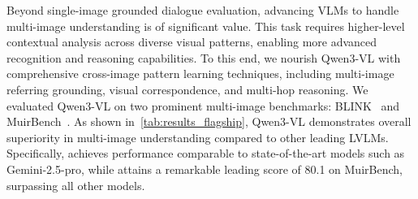 Beyond single-image grounded dialogue evaluation, advancing VLMs to handle multi-image understanding is of significant value. This task requires higher-level contextual analysis across diverse visual patterns, enabling more advanced recognition and reasoning capabilities. To this end, we nourish Qwen3-VL with comprehensive cross-image pattern learning techniques, including multi-image referring grounding, visual correspondence, and multi-hop reasoning. We evaluated Qwen3-VL on two prominent multi-image benchmarks: BLINK~\citep{fu2024blink} and MuirBench~\citep{wang2024muirbench}. As shown in~\cref{tab:results_flagship}, Qwen3-VL demonstrates overall superiority in multi-image understanding compared to other leading LVLMs. Specifically, \InstructBig achieves performance comparable to state-of-the-art models such as Gemini-2.5-pro, while \ThinkBig attains a remarkable leading score of 80.1 on MuirBench, surpassing all other models.